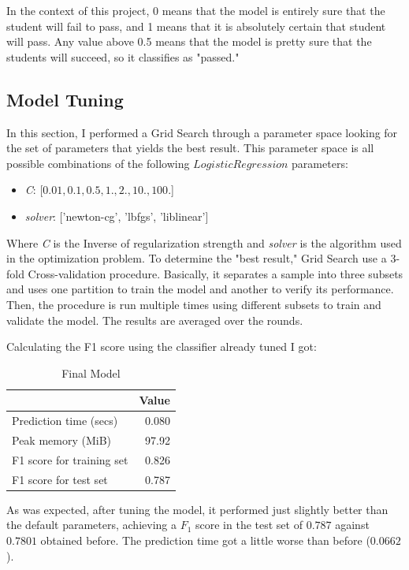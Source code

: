 \documentclass[a4paper]{article}
\begin{document}
In the context of this project, 0 means that the model is entirely sure that the student will fail to pass, and 1 means that it is absolutely certain that student will pass. Any value above 0.5 means that the model is pretty sure that the students will succeed, so it classifies as "passed."


\subsection{Model Tuning}
In this section, I performed a Grid Search through a parameter space looking for the set of parameters that yields the best result. This parameter space is all possible combinations of the following $Logistic Regression$ parameters:
\begin{itemize}
\item \textit{C}: [$0.01, 0.1, 0.5, 1., 2., 10., 100.$]
\item \textit{solver}: ['newton-cg', 'lbfgs', 'liblinear'] 
\end{itemize}

Where \textit{C} is the Inverse of regularization strength and \textit{solver} is the algorithm used in the optimization problem. To determine the "best result," Grid Search use a 3-fold Cross-validation procedure. Basically, it separates a sample into three subsets and uses one partition to train the model and another to verify its performance. Then, the procedure is run multiple times using different subsets to train and validate the model. The results are averaged over the rounds.

Calculating the F1 score using the classifier already tuned I got:

\begin{table}[ht]
\centering
\begin{tabular}{l|r}
 & Value \\\hline
Prediction time (secs) & 0.080 \\
Peak memory (MiB) & 97.92 \\
F1 score for training set & 0.826 \\
F1 score for test set & 0.787 \\
\end{tabular}
\caption{\label{tab:finalmodel}Final Model}
\end{table}

As was expected, after tuning the model, it performed just slightly better than the default parameters, achieving a $F_1$ score in the test set of $0.787$ against $0.7801$ obtained before. The prediction time got a little worse than before ($0.0662$).
\end{document}
